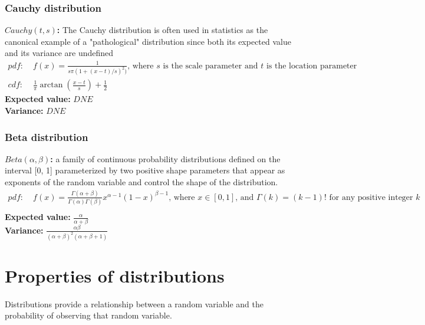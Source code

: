 \documentclass{article}
\begin{document}
\subsubsection{Cauchy distribution}
\textbf{$Cauchy(t, s)$:} The Cauchy distribution is often used in statistics as the canonical example of a "pathological" distribution since both its expected value and its variance are undefined
\begin{align*}
    pdf: & \; f(x) = \frac{1}{s \pi (1 + (x - t)/s)^2)} \textrm{, where } s \textrm{ is the scale parameter and } t \textrm{ is the location parameter}\\
    cdf: & \; \frac{1}{\pi} \arctan \left ( \frac{x - t}{s} \right ) + \frac{1}{2}
\end{align*}
\textbf{Expected value:} $DNE$\\
\textbf{Variance:} $DNE$

\subsubsection{Beta distribution}
\textbf{$Beta(\alpha, \beta)$:} a family of continuous probability distributions defined on the interval [0, 1] parameterized by two positive shape parameters that appear as exponents of the random variable and control the shape of the distribution.
\begin{align*}
    pdf: & \; f(x) = \frac{\Gamma(\alpha + \beta)}{\Gamma(\alpha) \Gamma(\beta)} x^{\alpha - 1} (1-x)^{\beta - 1} \textrm{, where } x \in [0, 1] \textrm{, and } \Gamma(k) = (k - 1)! \textrm{ for any positive integer } k\\
\end{align*}
\textbf{Expected value:} $\frac{\alpha}{\alpha + \beta}$\\
\textbf{Variance:} $\frac{\alpha \beta}{(\alpha + \beta)^2(\alpha + \beta + 1)}$

\section{Properties of distributions}
Distributions provide a relationship between a random variable and the probability of observing that random variable.

\end{document}
